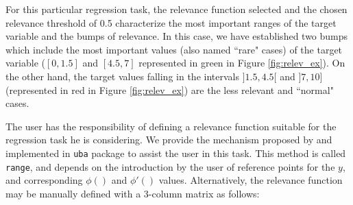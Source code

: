 \documentclass[10pt,a4paper]{article}\usepackage[]{graphicx}\usepackage[]{color}
\begin{document}
For this particular regression task, the relevance function selected and the chosen relevance threshold of 0.5 characterize the most important ranges of the target variable and the bumps of relevance. In this case, we have established two bumps which include the most important values (also named ``rare" cases) of the target variable ($[0, 1.5]$ and $[4.5, 7]$ represented in green in Figure \ref{fig:relev_ex}). On the other hand, the target values falling in the intervals $]1.5, 4.5[$ and $]7,10]$ (represented in red in Figure \ref{fig:relev_ex}) are the less relevant and ``normal" cases.


The user has the responsibility of defining a relevance function suitable for the regression task he is considering. We provide the mechanism proposed by \cite{ribeiro2011utility} and implemented in \texttt{uba} package to assist the user in this task. This method is called \texttt{range}, and depends on the introduction by the user of reference points for the $y$, and corresponding $\phi()$ and $\phi'()$ values. Alternatively, the relevance function may be manually defined with a 3-column matrix as follows:
\end{document}
